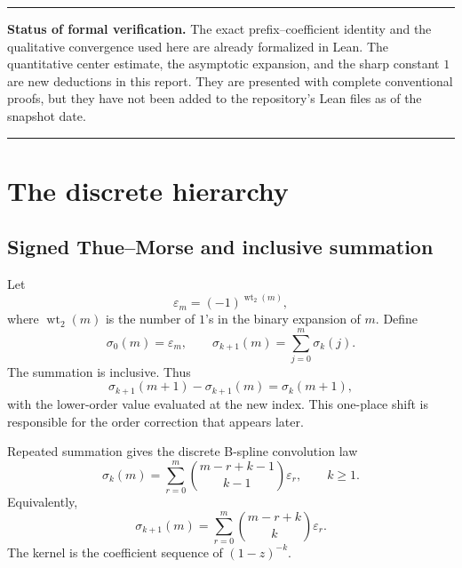 \documentclass[11pt,oneside]{article}
\theoremstyle{definition}
\theoremstyle{remark}
\newcommand{\wt}{\operatorname{wt}_2}
\newenvironment{boxedremark}{%
  \par\smallskip\noindent\begin{center}\begin{minipage}{0.94\textwidth}%
  \color{black}\hrule\vspace{0.6em}\small
}{%
  \vspace{0.6em}\hrule\end{minipage}\end{center}\smallskip
}
\begin{document}
\begin{boxedremark}
\textbf{Status of formal verification.}
The exact prefix--coefficient identity and the qualitative convergence used here
are already formalized in Lean.  The quantitative center estimate, the asymptotic
expansion, and the sharp constant $1$ are new deductions in this report.  They
are presented with complete conventional proofs, but they have not been added to
the repository's Lean files as of the snapshot date.
\end{boxedremark}

\section{The discrete hierarchy}
\label{tmrate:sec:discrete}

\subsection{Signed Thue--Morse and inclusive summation}

Let
\begin{equation}
 \varepsilon_m=(-1)^{\wt(m)},                              \label{tmrate:eq:tm-sign}
\end{equation}
where $\wt(m)$ is the number of $1$'s in the binary expansion of $m$.  Define
\begin{equation}
 \sigma_0(m)=\varepsilon_m,
 \qquad
 \sigma_{k+1}(m)=\sum_{j=0}^{m}\sigma_k(j).                \label{tmrate:eq:prefix-def}
\end{equation}
The summation is inclusive.  Thus
\begin{equation}
 \sigma_{k+1}(m+1)-\sigma_{k+1}(m)=\sigma_k(m+1),           \label{tmrate:eq:forward-difference}
\end{equation}
with the lower-order value evaluated at the new index.  This one-place shift is
responsible for the order correction that appears later.

Repeated summation gives the discrete B-spline convolution law
\begin{equation}
 \sigma_k(m)=\sum_{r=0}^{m}
 \binom{m-r+k-1}{k-1}\varepsilon_r,
 \qquad k\ge1.                                             \label{tmrate:eq:binomial-convolution}
\end{equation}
Equivalently,
\begin{equation}
 \sigma_{k+1}(m)=\sum_{r=0}^{m}
 \binom{m-r+k}{k}\varepsilon_r.                            \label{tmrate:eq:binomial-convolution-shift}
\end{equation}
The kernel is the coefficient sequence of $(1-z)^{-k}$.
\end{document}
